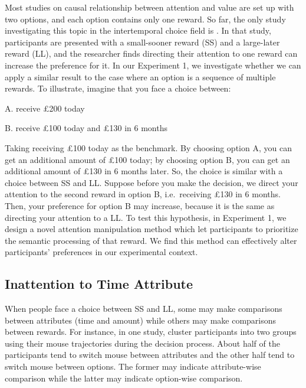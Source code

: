 \documentclass[
  12pt,
]{article}
\begin{document}
Most studies on causal relationship between attention and value are set
up with two options, and each option contains only one reward. So far,
the only study investigating this topic in the intertemporal choice
field is \citet{fisher2021intertemporal}. In that study, participants
are presented with a small-sooner reward (SS) and a large-later reward
(LL), and the researcher finds directing their attention to one reward
can increase the preference for it. In our Experiment 1, we investigate
whether we can apply a similar result to the case where an option is a
sequence of multiple rewards. To illustrate, imagine that you face a
choice between:

\setlength{\leftskip}{24pt}

A. receive £200 today

B. receive £100 today and £130 in 6 months

\setlength{\leftskip}{0pt}

Taking receiving £100 today as the benchmark. By choosing option A, you
can get an additional amount of £100 today; by choosing option B, you
can get an additional amount of £130 in 6 months later. So, the choice
is similar with a choice between SS and LL. Suppose before you make the
decision, we direct your attention to the second reward in option B,
i.e.~receiving £130 in 6 months. Then, your preference for option B may
increase, because it is the same as directing your attention to a LL. To
test this hypothesis, in Experiment 1, we design a novel attention
manipulation method which let participants to prioritize the semantic
processing of that reward. We find this method can effectively alter
participants' preferences in our experimental context.

\hypertarget{inattention-to-time-attribute}{%
\subsection{\texorpdfstring{Inattention to Time Attribute
\label{attention_time}}{Inattention to Time Attribute }}\label{inattention-to-time-attribute}}

When people face a choice between SS and LL, some may make comparisons
between attributes (time and amount) while others may make comparisons
between rewards. For instance, in one study, \citet{reeck2017search}
cluster participants into two groups using their mouse trajectories
during the decision process. About half of the participants tend to
switch mouse between attributes and the other half tend to switch mouse
between options. The former may indicate attribute-wise comparison while
the latter may indicate option-wise comparison.
\end{document}
